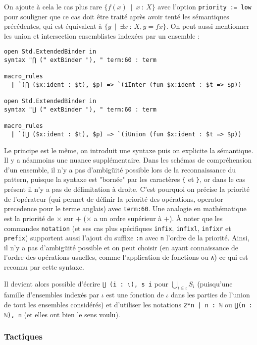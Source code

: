 \documentclass[a4paper, 12pt]{article}
\newcommand{\lean}[1]{\texttt{#1}}
\begin{document}
On ajoute à cela le cas plus rare $\{f(x)\ \mid\ x\ :\ X\}$ avec l'option \lean{priority := low} pour souligner que ce cas doit être traité après avoir tenté les sémantiques précédentes, qui est équivalent à $\{y\ \mid\ \exists x\ :\ X, y = f x\}$. On peut aussi mentionner les union et intersection ensemblistes indexées par un ensemble :

\begin{verbatim}
open Std.ExtendedBinder in
syntax "⋂ (" extBinder "), " term:60 : term

macro_rules
  | `(⋂ ($x:ident : $t), $p) => `(iInter (fun $x:ident : $t => $p))

open Std.ExtendedBinder in
syntax "⋃ (" extBinder "), " term:60 : term

macro_rules
  | `(⋃ ($x:ident : $t), $p) => `(iUnion (fun $x:ident : $t => $p))
\end{verbatim}

Le principe est le même, on introduit une syntaxe puis on explicite la sémantique. Il y a néanmoins une nuance supplémentaire. Dans les schémas de compréhension d'un ensemble, il n'y a pas d'ambigüité possible lors de la reconnaissance du pattern, puisque la syntaxe est "bornée" par les caractères \lean{\{} et \lean{\}}, or dans le cas présent il n'y a pas de délimitation à droite. C'est pourquoi on précise la priorité de l'opérateur (qui permet de définir la priorité des opérations, operator precedence pour le terme anglais) avec \lean{term:60}. Une analogie en mathématique est la priorité de $\times$ sur $+$ ($\times$ a un ordre supérieur à $+$). À noter que les commandes \lean{notation} (et ses cas plus spécifiques \lean{infix}, \lean{infixl}, \lean{infixr} et \lean{prefix}) supportent aussi l'ajout du suffixe \lean{:n} avec \lean{n} l'ordre de la priorité. Ainsi, il n'y a pas d'ambigüité possible et on peut choisir (en ayant connaissance de l'ordre des opérations usuelles, comme l'application de fonctions ou \lean{∧}) ce qui est reconnu par cette syntaxe.

Il devient alors possible d'écrire \lean{⋃ (i : ι), s i} pour $\bigcup_{i\in\iota} S_i$ (puisqu'une famille d'ensembles indexés par $\iota$ est une fonction de $\iota$ dans les parties de l'union de tout les ensembles considérés) et d'utiliser les notations \lean{{2*n | n : ℕ}} ou \lean{⋃(n : ℕ), {n}} (et elles ont bien le sens voulu).

\subsubsection{Tactiques}
\end{document}
